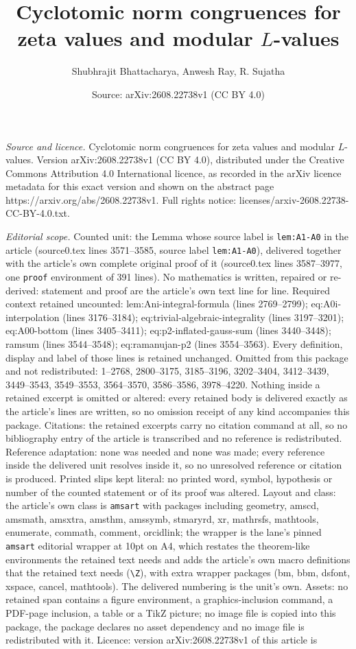 \documentclass[10pt,a4paper]{amsart}
\title[Cyclotomic norm congruences for zeta values and modular $L$-]{Cyclotomic norm congruences for zeta values and modular $L$-values}
\author{Shubhrajit Bhattacharya, Anwesh Ray, R. Sujatha}
\date{Source: arXiv:2608.22738v1 (CC BY 4.0)}
\begin{document}
\maketitle

\noindent\emph{Source and licence.} Cyclotomic norm congruences for zeta values and modular $L$-values. Version arXiv:2608.22738v1 (CC BY 4.0), distributed under the Creative Commons Attribution 4.0 International licence, as recorded in the arXiv licence metadata for this exact version and shown on the abstract page https://arxiv.org/abs/2608.22738v1. Full rights notice: licenses/arxiv-2608.22738-CC-BY-4.0.txt.\par\smallskip

\noindent\textit{Editorial scope.} Counted unit: the Lemma whose source label is \texttt{lem:A1-A0} in the article (source0.tex lines 3571--3585, source label \texttt{lem:A1-A0}), delivered together with the article's own complete original proof of it (source0.tex lines 3587--3977, one \texttt{proof} environment of 391 lines). No mathematics is written, repaired or re-derived: statement and proof are the article's own text line for line. Required context retained uncounted: lem:Ani-integral-formula (lines 2769--2799); eq:A0i-interpolation (lines 3176--3184); eq:trivial-algebraic-integrality (lines 3197--3201); eq:A00-bottom (lines 3405--3411); eq:p2-inflated-gauss-sum (lines 3440--3448); ramsum (lines 3544--3548); eq:ramanujan-p2 (lines 3554--3563). Every definition, display and label of those lines is retained unchanged. Omitted from this package and not redistributed: 1--2768, 2800--3175, 3185--3196, 3202--3404, 3412--3439, 3449--3543, 3549--3553, 3564--3570, 3586--3586, 3978--4220. Nothing inside a retained excerpt is omitted or altered: every retained body is delivered exactly as the article's lines are written, so no omission receipt of any kind accompanies this package. Citations: the retained excerpts carry no citation command at all, so no bibliography entry of the article is transcribed and no reference is redistributed. Reference adaptation: none was needed and none was made; every reference inside the delivered unit resolves inside it, so no unresolved reference or citation is produced. Printed slips kept literal: no printed word, symbol, hypothesis or number of the counted statement or of its proof was altered. Layout and class: the article's own class is \texttt{amsart} with packages including geometry, amscd, amsmath, amsxtra, amsthm, amssymb, stmaryrd, xr, mathrsfs, mathtools, enumerate, commath, comment, orcidlink; the wrapper is the lane's pinned \texttt{amsart} editorial wrapper at 10pt on A4, which restates the theorem-like environments the retained text needs and adds the article's own macro definitions that the retained text needs (\texttt{\textbackslash Z}), with extra wrapper packages (bm, bbm, dsfont, xspace, cancel, mathtools). The delivered numbering is the unit's own. Assets: no retained span contains a figure environment, a graphics-inclusion command, a PDF-page inclusion, a table or a TikZ picture; no image file is copied into this package, the package declares no asset dependency and no image file is redistributed with it. Licence: version arXiv:2608.22738v1 of this article is 
\end{document}
